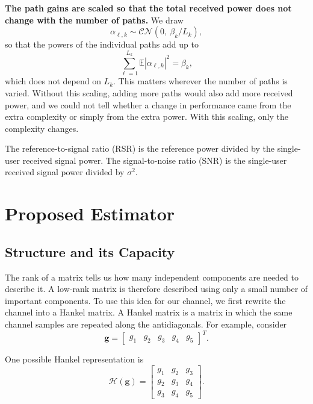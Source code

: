 \documentclass[journal]{IEEEtran}
\newcommand{\bg}{\mathbf{g}}
\newcommand{\CN}{\mathcal{CN}}
\newcommand{\Hank}{\mathcal{H}}
\begin{document}
\textbf{The path gains are scaled so that the total received power does not
change with the number of paths.} We draw
\begin{equation}
\alpha_{\ell,k}\sim\CN\!\left(0,\ \beta_k/L_k\right),
\label{eq:pathnorm}
\end{equation}
so that the powers of the individual paths add up to
\begin{equation}
\sum_{\ell=1}^{L_k}\mathbb{E}\left|\alpha_{\ell,k}\right|^2=\beta_k,
\end{equation}
which does not depend on $L_k$. This matters wherever the number of paths is
varied. Without this scaling, adding more paths would also add more received
power, and we could not tell whether a change in performance came from the
extra complexity or simply
from the extra power. With this scaling, only the complexity changes.

The reference-to-signal ratio (RSR) is the reference power divided by the
single-user received signal power. The signal-to-noise ratio (SNR) is the
single-user received signal power divided by $\sigma^2$.

\section{Proposed Estimator}

\subsection{Structure and its Capacity}

The rank of a matrix tells us how many independent components are needed to
describe it. A low-rank matrix is therefore described using only a small number
of important components. To use this idea for our channel, we first rewrite the
channel into a Hankel matrix. A Hankel matrix is a matrix in which the same
channel samples are repeated along the antidiagonals. For example, consider
\begin{equation}
\bg=\begin{bmatrix}g_1&g_2&g_3&g_4&g_5\end{bmatrix}^T.
\end{equation}

One possible Hankel representation is
\begin{equation}
\Hank(\bg)=\begin{bmatrix}
g_1&g_2&g_3\\
g_2&g_3&g_4\\
g_3&g_4&g_5
\end{bmatrix}.
\end{equation}
\end{document}
